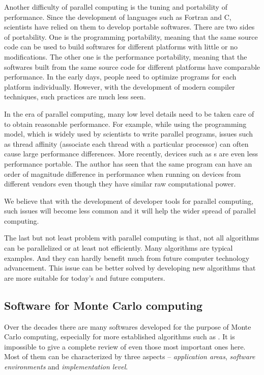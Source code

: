 Another difficulty of parallel computing is the tuning and portability of performance. Since the development of languages such as Fortran and C, scientists have relied on them to develop portable softwares. There are two sides of portability. One is the programming portability, meaning that the same source code can be used to build softwares for different platforms with little or no modifications. The other one is the performance portability, meaning that the softwares built from the same source code for different platforms have comparable performance. In the early days, people need to optimize programs for each platform individually. However, with the development of modern compiler techniques, such practices are much less seen.

In the era of parallel computing, many low level details need to be taken care of to obtain reasonable performance. For example, while using the \openmp programming model, which is widely used by scientists to write parallel programs, issues such as thread affinity (associate each thread with a particular processor) can often cause large performance differences. More recently, devices such as \gpu{}s are even less performance portable. The author has seen that the same \opencl \cite{opencl} program can have an order of magnitude difference in performance when running on devices from different vendors even though they have similar raw computational power.

We believe that with the development of developer tools for parallel computing, such issues will become less common and it will help the wider spread of parallel computing.

The last but not least problem with parallel computing is that, not all algorithms can be parallelized or at least not efficiently. Many \mcmc algorithms are typical examples. And they can hardly benefit much from future computer technology advancement. This issue can be better solved by developing new algorithms that are more suitable for today's and future computers.

\subsection{Software for Monte Carlo computing}
\label{sub:Softwares for Monte Carlo computing}

Over the decades there are many softwares developed for the purpose of Monte Carlo computing, especially for more established algorithms such as \mcmc. It is impossible to give a complete review of even those most important ones here. Most of them can be characterized by three aspects -- \emph{application areas}, \emph{software environments} and \emph{implementation level}.

